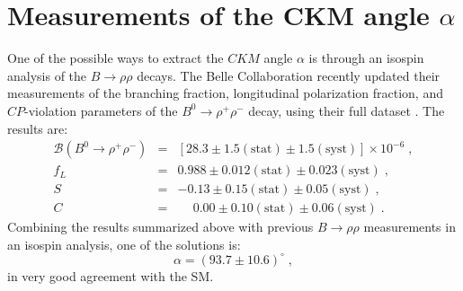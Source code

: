 \section{Measurements of the CKM angle $\alpha$}
\label{sec:alpha}

One of the possible ways to extract the $CKM$ angle $\alpha$ is through
an isospin analysis of the $B \to \rho\rho$ decays. The Belle Collaboration
recently updated their measurements of the branching fraction, longitudinal
polarization fraction, and $CP$-violation parameters of the $B^0 \to \rho^+\rho^-$
decay, using their full dataset \cite{belle_rhorho}. The results are:
\begin{eqnarray}
  \mathcal{B} (B^0 \to \rho^+\rho^-) & = & [28.3 \pm 1.5 (\mbox{stat}) \pm 1.5 (\mbox{syst})] \times 10^{-6} \; , \\ 
  f_L & = & 0.988 \pm 0.012 (\mbox{stat}) \pm 0.023 (\mbox{syst}) \; , \\
  S & = & -0.13 \pm 0.15 (\mbox{stat}) \pm 0.05 (\mbox{syst}) \; , \\
  C & = & \phantom{-}0.00 \pm 0.10 (\mbox{stat}) \pm 0.06 (\mbox{syst}) \; .
\end{eqnarray}
Combining the results summarized above with previous $B \to \rho\rho$
measurements in an isospin analysis, one of the solutions is:
\begin{equation}
  \alpha = (93.7 \pm 10.6)^{\circ} \; ,
\end{equation}
in very good agreement with the SM.
